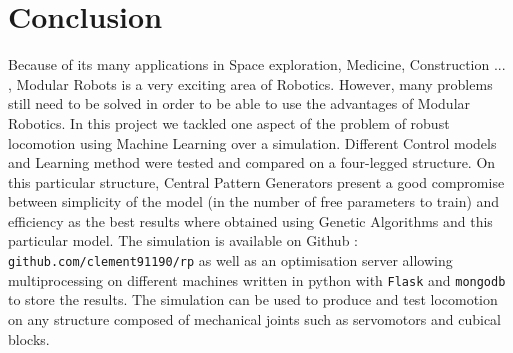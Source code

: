 
\chapter{Conclusion} %

\label{} %


Because of its many applications in Space exploration, Medicine, Construction ... , Modular Robots is a very exciting area of Robotics. However, many problems still need to be solved in order to be able to use the advantages of Modular Robotics. In this project we tackled one aspect of the problem of robust locomotion using Machine Learning over a simulation. Different Control models and Learning method were tested and compared on a four-legged structure. On this particular structure, Central Pattern Generators present a good compromise between simplicity of the model (in the number of free parameters to train) and efficiency as the best results where obtained using Genetic Algorithms and this particular model.  The simulation is available on Github : \verb?github.com/clement91190/rp? as well as an optimisation server allowing multiprocessing on different machines written in python with \verb?Flask? and \verb?mongodb? to store the results. The simulation can be used to produce and test locomotion on any structure composed of mechanical joints such as servomotors and cubical blocks. 
